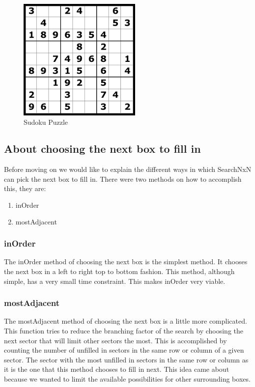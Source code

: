 \documentclass[letterpaper]{article}
\begin{document}
\begin{figure}[h]
	\centering
	\includegraphics[width=60mm]{./Sudoku-games.png}
	\caption{Sudoku Puzzle}
	\label{fig:sudoku-puzzle}
\end{figure}

\subsection{About choosing the next box to fill in}

Before moving on we would like to explain the different ways in which SearchNxN can pick the next box to fill in. There were two methods on how to accomplish this, they are:

\begin{enumerate}
  \item inOrder
  \item mostAdjacent
\end{enumerate}

\subsubsection{inOrder}

The inOrder method of choosing the next box is the simplest method. It chooses the next box in a left to right top to bottom fashion. This method, although simple, has a very small time constraint. This makes inOrder very viable.

\subsubsection{mostAdjacent}

The mostAdjacent method of choosing the next box is a little more complicated. This function tries to reduce the branching factor of the search by choosing the next sector that will limit other sectors the most. This is accomplished by counting the number of unfilled in sectors in the same row or column of a given sector. The sector with the most unfilled in sectors in the same row or column as it is the one that this method chooses to fill in next. This idea came about because we wanted to limit the available possibilities for other surrounding boxes.
\end{document}
